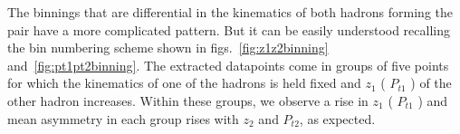 The binnings that are differential in the kinematics of both hadrons forming the pair have a more complicated pattern. But it can be easily understood recalling the bin numbering scheme shown in figs.~\ref{fig:z1z2binning} and~\ref{fig:pt1pt2binning}. The extracted datapoints come in groups of five points for which the kinematics of one of the hadrons is held fixed and $z_1$ ( $P_{t1}$ ) of the other hadron increases. Within these groups, we observe a rise in $z_1$ ( $P_{t1}$ ) and mean asymmetry in each group rises with $z_2$ and $P_{t2}$, as expected.

\begin{figure}[H]
  \centering     

\end{figure}
